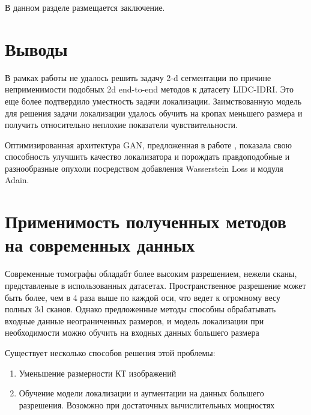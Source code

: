 \startconclusionpage

В данном разделе размещается заключение.

\section{Выводы}

В рамках работы не удалось решить задачу 2-d сегментации по причине неприменимости подобных 2d end-to-end методов к датасету LIDC-IDRI. Это еще более подтвердило уместность задачи локализации. Заимствованную модель для решения задачи локализации удалось обучить на кропах меньшего размера и получить относительно неплохие показатели чувствительности.

Оптимизированная архитектура GAN, предложенная в работе \cite{mirsky}, показала свою способность улучшить качество локализатора и порождать правдоподобные и разнообразные опухоли посредством добавления Wasserstein Loss и модуля Adain.

\section{Применимость полученных методов на современных данных}

Современные томографы обладабт более высоким разрешением, нежели сканы, представленые в использованных датасетах. Пространственное разрешение может быть более, чем в 4 раза выше по каждой оси, что ведет к огромному весу полных 3d сканов. Однако предложенные методы способны обрабатывать входные данные неограниченных размеров, и модель локализации при необходимости можно обучить на входных данных большего размера

Существует несколько способов решения этой проблемы:

\begin{enumerate}
    \item Уменьшение размерности КТ изображений
    \item Обучение модели локализации и аугментации на данных большего разрешения. Возомжно при достаточных вычислительных мощностях
\end{enumerate}
